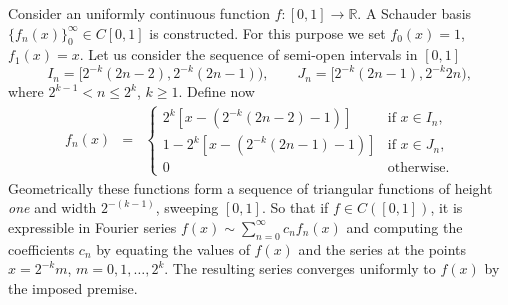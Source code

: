 \documentclass[12pt]{article}
\begin{document}
Consider an uniformly continuous function $f:[0,1]\rightarrow\mathbb{R}$. A Schauder basis $\{f_n(x)\}_0^\infty\in C[0,1]$ is constructed. For this purpose we set $f_0(x)=1$, $f_1(x)=x$. Let us consider the sequence of semi-open intervals in $[0,1]$
\begin{equation*}
I_n=[2^{-k}(2n-2),2^{-k}(2n-1)), \qquad J_n=[2^{-k}(2n-1),2^{-k}2n),
\end{equation*}
where $2^{k-1}<n\leq 2^k$, $k\geq 1$. Define now
\begin{eqnarray*}
f_n(x) &=& \left\{\begin{array}{ll}
2^k[x-(2^{-k}(2n-2)-1)] & \text{if}\,\, x\in I_n, \\
1-2^k[x-(2^{-k}(2n-1)-1)] & \text{if}\,\, x\in J_n, \\
0 & \text{otherwise.}
\end{array} \right.
\end{eqnarray*}
Geometrically these functions form a sequence of triangular functions of height {\em one} and width $2^{-(k-1)}$, sweeping $[0,1]$. So that if $f\in C([0,1])$, it is expressible in Fourier series $f(x)\sim \sum_{n=0}^\infty c_nf_n(x)$ and computing the coefficients $c_n$ by equating the values of $f(x)$ and the series at the points $x=2^{-k}m$, $m=0,1,\ldots,2^k$. The resulting series converges uniformly to $f(x)$ by the imposed premise.

\end{document}
